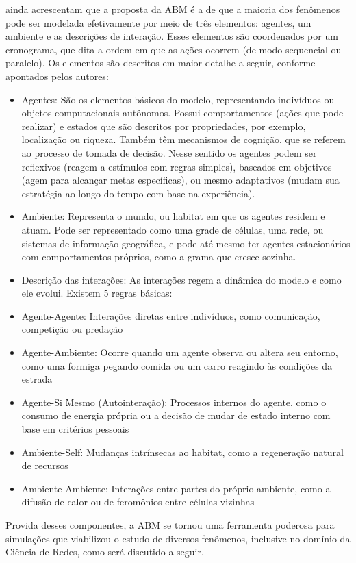 \documentclass[12pt,oneside,a4paper,brazil,sumario=tradicional]{abntex2}
\begin{document}
 ainda acrescentam que a proposta da ABM é a de que a maioria dos fenômenos pode ser modelada efetivamente por meio de três elementos: agentes, um ambiente e as descrições de interação. Esses elementos são coordenados por um cronograma, que dita a ordem em que as ações ocorrem (de modo sequencial ou paralelo). Os elementos são descritos em maior detalhe a seguir, conforme apontados pelos autores:

\begin{itemize}
  \item Agentes: São os elementos básicos do modelo, representando indivíduos ou objetos computacionais autônomos. Possui comportamentos (ações que pode realizar) e estados que são descritos por propriedades, por exemplo, localização ou riqueza. Também têm mecanismos de cognição, que se referem ao processo de tomada de decisão. Nesse sentido os agentes podem ser reflexivos (reagem a estímulos com regras simples), baseados em objetivos (agem para alcançar metas específicas), ou mesmo adaptativos (mudam sua estratégia ao longo do tempo com base na experiência).
  \item Ambiente: Representa o mundo, ou habitat em que os agentes residem e atuam. Pode ser representado como uma grade de células, uma rede, ou sistemas de informação geográfica, e pode até mesmo ter agentes estacionários com comportamentos próprios, como a grama que cresce sozinha.
  \item Descrição das interações: As interações regem a dinâmica do modelo e como ele evolui. Existem 5 regras básicas:
  \item Agente-Agente: Interações diretas entre indivíduos, como comunicação, competição ou predação
  \item Agente-Ambiente: Ocorre quando um agente observa ou altera seu entorno, como uma formiga pegando comida ou um carro reagindo às condições da estrada
  \item Agente-Si Mesmo (Autointeração): Processos internos do agente, como o consumo de energia própria ou a decisão de mudar de estado interno com base em critérios pessoais
  \item Ambiente-Self: Mudanças intrínsecas ao habitat, como a regeneração natural de recursos
  \item Ambiente-Ambiente: Interações entre partes do próprio ambiente, como a difusão de calor ou de feromônios entre células vizinhas
\end{itemize}
Provida desses componentes, a ABM se tornou uma ferramenta poderosa para simulações que viabilizou o estudo de diversos fenômenos, inclusive no domínio da Ciência de Redes, como será discutido a seguir.
\end{document}
